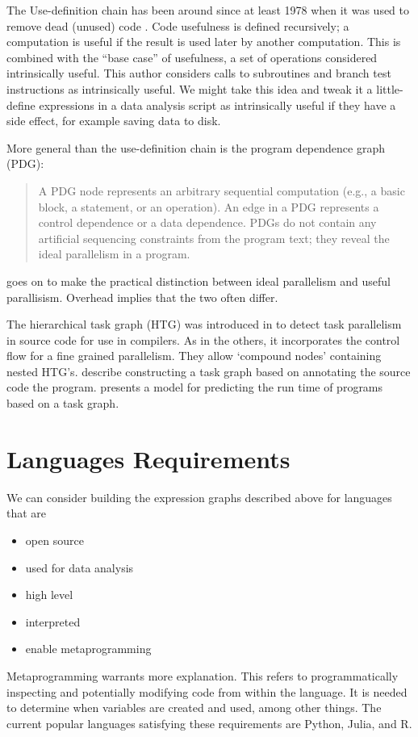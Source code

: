 \documentclass[12pt]{article}
\begin{document}
The Use-definition chain has been around since at least 1978
when it was used to remove dead (unused) code \cite{kennedy1978use}.
Code usefulness is defined recursively; a computation is useful if the result is
used later by another computation. This is combined with the ``base case''
of usefulness, a set of operations considered
intrinsically useful. This author considers calls to subroutines and branch
test instructions as intrinsically useful. We might take this idea and
tweak it a little- define expressions in a data analysis script as
intrinsically useful if they have a side effect, for example
saving data to disk.

More general than the use-definition chain is the program dependence graph (PDG)\cite{ferrante1987}:
\begin{quote}
    A PDG node represents
    an arbitrary sequential computation (e.g., a basic block, a
    statement, or an operation). An edge in a PDG represents
    a control dependence or a data dependence. PDGs do not
    contain any artificial sequencing constraints from the
    program text; they reveal the ideal parallelism in a
    program. \cite{sarkar1991automatic} 
\end{quote}
\cite{sarkar1991automatic} goes on to make the practical distinction between ideal
parallelism and useful parallisism. Overhead implies that the two often
differ.

The hierarchical task graph (HTG) was introduced in \cite{girkar1992automatic}
to detect task parallelism in source code for use in compilers.
As in the others, it incorporates the control flow for a fine grained
parallelism. They allow `compound nodes' containing nested HTG's.
\cite{cosnard1995automatic} describe constructing a task graph based on
annotating the source code the program.
\cite{adve2004parallel} presents a model for predicting the run time of
programs based on a task graph. 


\section{Languages Requirements}

We can consider building the expression graphs described above for languages that are
\begin{itemize}
    \item open source
    \item used for data analysis
    \item high level
    \item interpreted
    \item enable metaprogramming
\end{itemize}
Metaprogramming warrants more explanation. This refers to programmatically
inspecting and potentially modifying code from within the language.  It is
needed to determine when variables are created and used, among other
things.  The current popular languages satisfying these requirements are
Python, Julia, and R.
\end{document}
